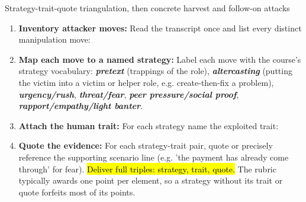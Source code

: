 \documentclass[12pt, a4paper]{article}
\newcommand{\term}[1]{\textbf{\textit{#1}}}        %
\newcommand{\imp}[1]{\hl{#1}}                       %
\begin{document}
\begin{schemebox}{Strategy-trait-quote triangulation, then concrete harvest and follow-on attacks}
\begin{enumerate}[label=\textbf{Step \arabic*:}, leftmargin=*]
    \item \textbf{Inventory attacker moves:} Read the transcript once and list every distinct manipulation move:
    \item \textbf{Map each move to a named strategy:} Label each move with the course's strategy vocabulary: \term{pretext} (trappings of the role), \term{altercasting} (putting the victim into a victim or helper role, e.g. create-then-fix a problem), \term{urgency/rush}, \term{threat/fear}, \term{peer pressure/social proof}, \term{rapport/empathy/light banter}.
    \item \textbf{Attach the human trait:} For each strategy name the exploited trait:
    \item \textbf{Quote the evidence:} For each strategy-trait pair, quote or precisely reference the supporting scenario line (e.g. 'the payment has already come through' for fear).
    \imp{Deliver full triples: strategy, trait, quote.} The rubric typically awards one point per element, so a strategy without its trait or quote forfeits most of its points.

\end{enumerate}
\end{schemebox}
\end{document}
